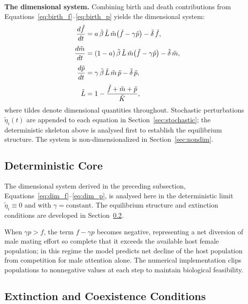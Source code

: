 \documentclass[12pt]{article}
\begin{document}
\noindent\textbf{The dimensional system.}
Combining birth and death contributions from
Equations~\eqref{eq:birth_f}--\eqref{eq:birth_p} yields the
dimensional system:
%
\begin{align}
  \frac{d\tilde{f}}{dt} &=
    a\,\tilde{\beta}\,\tilde{L}\,\tilde{m}
    \!\left(\tilde{f}-\gamma\tilde{p}\right)
    - \tilde{\delta}\,\tilde{f},
    \label{eq:dim_f}\\[4pt]
  \frac{d\tilde{m}}{dt} &=
    (1-a)\,\tilde{\beta}\,\tilde{L}\,\tilde{m}
    \!\left(\tilde{f}-\gamma\tilde{p}\right)
    - \tilde{\delta}\,\tilde{m},
    \label{eq:dim_m}\\[4pt]
  \frac{d\tilde{p}}{dt} &=
    \gamma\,\tilde{\beta}\,\tilde{L}\,\tilde{m}\,\tilde{p}
    - \tilde{\delta}\,\tilde{p},
    \label{eq:dim_p}\\[4pt]
  \tilde{L} &= 1 - \frac{\tilde{f}+\tilde{m}+\tilde{p}}{\tilde{K}},
    \notag
\end{align}
%
where tildes denote dimensional quantities throughout.
Stochastic perturbations $\tilde{\eta}_i(t)$ are appended to each
equation in Section~\ref{sec:stochastic}; the deterministic skeleton
above is analysed first to establish the equilibrium structure.
The system is non-dimensionalized in Section~\ref{sec:nondim}.

\subsection{Deterministic Core}\label{sec:deterministic}

The dimensional system derived in the preceding subsection,
Equations~\eqref{eq:dim_f}--\eqref{eq:dim_p}, is analysed here in the
deterministic limit $\tilde{\eta}_i \equiv 0$ and with $\gamma =
\text{constant}$.  The equilibrium structure and extinction conditions
are developed in Section~\ref{sec:extinction}.

When $\gamma p > f$, the term $f - \gamma p$ becomes negative,
representing a net diversion of male mating effort so complete that it
exceeds the available host female population; in this regime the model
predicts net decline of the host population from competition for male
attention alone.  The numerical implementation clips populations to
nonnegative values at each step to maintain biological feasibility.


\subsection{Extinction and Coexistence Conditions}\label{sec:extinction}
\end{document}
